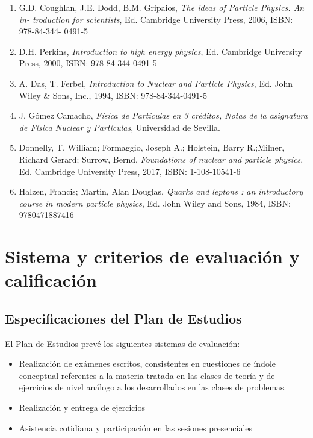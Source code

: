 \documentclass[a4paper,12pt,twoside]{article}
\begin{document}
\begin{enumerate}
\item G.D. Coughlan, J.E. Dodd, B.M. Gripaios, \textit{The ideas of Particle Physics. An in-
troduction for scientists}, Ed. Cambridge University Press, 2006, ISBN: 978-84-344-
0491-5

\item D.H. Perkins, \textit{Introduction to high energy physics}, Ed. Cambridge University Press,
2000, ISBN: 978-84-344-0491-5

\item A. Das, T. Ferbel, \textit{Introduction to Nuclear and Particle Physics}, Ed. John Wiley \&
Sons, Inc., 1994, ISBN: 978-84-344-0491-5

\item J. Gómez Camacho, \textit{Física de Partículas en 3 créditos, Notas de la asignatura de
Física Nuclear y Partículas}, Universidad de Sevilla.

\item Donnelly, T. William; Formaggio, Joseph A.; Holstein, Barry R.;Milner, Richard
Gerard; Surrow, Bernd, \textit{Foundations of nuclear and particle physics}, Ed. Cambridge
University Press, 2017, ISBN: 1-108-10541-6

\item Halzen, Francis; Martin, Alan Douglas, \textit{Quarks and leptons : an introductory course
in modern particle physics}, Ed. John Wiley and Sons, 1984, ISBN: 9780471887416

\end{enumerate}



\section{Sistema y criterios de evaluación y calificación}

\subsection{Especificaciones del Plan de Estudios}

El Plan de Estudios \cite{planest} prevé los siguientes sistemas de evaluación:

\begin{itemize}
\item Realización de exámenes escritos, consistentes en cuestiones de índole conceptual referentes a la materia tratada en las clases de teoría y de ejercicios de nivel análogo a los desarrollados en las clases de problemas.

\item Realización y entrega de ejercicios

\item Asistencia cotidiana y participación en las sesiones presenciales
\end{itemize}
\end{document}
